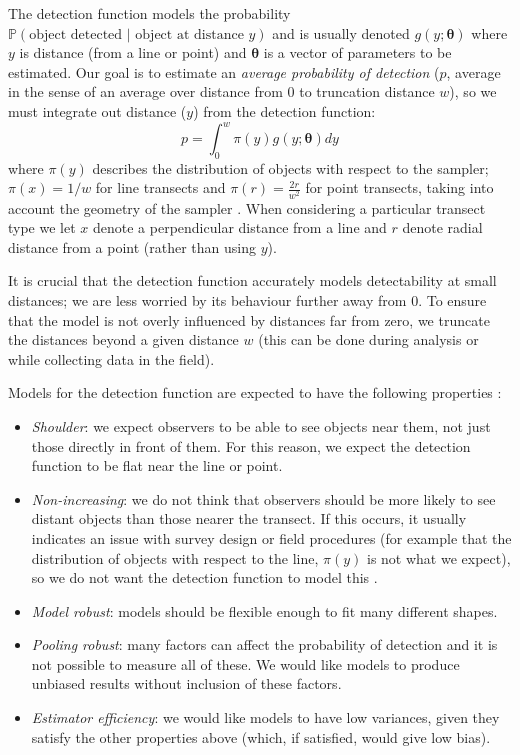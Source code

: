\documentclass[article]{jss}
\providecommand{\tightlist}{%
  \setlength{\itemsep}{0pt}\setlength{\parskip}{0pt}}
\begin{document}
The detection function models the probability
\(\mathbb{P}(\text{object detected } \vert \text{ object at distance } y)\)
and is usually denoted \(g(y; \boldsymbol{\theta})\) where \(y\) is
distance (from a line or point) and \(\boldsymbol{\theta}\) is a vector
of parameters to be estimated. Our goal is to estimate an \emph{average
probability of detection} (\(p\), average in the sense of an average
over distance from \(0\) to truncation distance \(w\)), so we must
integrate out distance (\(y\)) from the detection function: \[
p = \int_0^w \pi(y) g(y; \boldsymbol{\theta}) dy
\] where \(\pi(y)\) describes the distribution of objects with respect
to the sampler; \(\pi(x)=1/w\) for line transects and
\(\pi(r)=\frac{2r}{w^2}\) for point transects, taking into account the
geometry of the sampler \citep[usually referred to as the
\emph{probability density function of distances};][Chapter
3]{Buckland:2001vm}. When considering a particular transect type we let
\(x\) denote a perpendicular distance from a line and \(r\) denote
radial distance from a point (rather than using \(y\)).

It is crucial that the detection function accurately models
detectability at small distances; we are less worried by its behaviour
further away from 0. To ensure that the model is not overly influenced
by distances far from zero, we truncate the distances beyond a given
distance \(w\) (this can be done during analysis or while collecting
data in the field).

Models for the detection function are expected to have the following
properties \citep[Chapter 5]{buckland2015distance}:

\begin{itemize}
\tightlist
\item
  \emph{Shoulder}: we expect observers to be able to see objects near
  them, not just those directly in front of them. For this reason, we
  expect the detection function to be flat near the line or point.
\item
  \emph{Non-increasing}: we do not think that observers should be more
  likely to see distant objects than those nearer the transect. If this
  occurs, it usually indicates an issue with survey design or field
  procedures (for example that the distribution of objects with respect
  to the line, \(\pi(y)\) is not what we expect), so we do not want the
  detection function to model this
  \citep{Marques:2010he, Marques:2012fy, Miller:2015hw}.
\item
  \emph{Model robust}: models should be flexible enough to fit many
  different shapes.
\item
  \emph{Pooling robust}: many factors can affect the probability of
  detection and it is not possible to measure all of these. We would
  like models to produce unbiased results without inclusion of these
  factors.
\item
  \emph{Estimator efficiency}: we would like models to have low
  variances, given they satisfy the other properties above (which, if
  satisfied, would give low bias).
\end{itemize}
\end{document}

